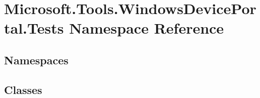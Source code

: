 \hypertarget{namespace_microsoft_1_1_tools_1_1_windows_device_portal_1_1_tests}{}\section{Microsoft.\+Tools.\+Windows\+Device\+Portal.\+Tests Namespace Reference}
\label{namespace_microsoft_1_1_tools_1_1_windows_device_portal_1_1_tests}
\subsection*{Namespaces}
\begin{DoxyCompactItemize}
\end{DoxyCompactItemize}
\subsection*{Classes}

